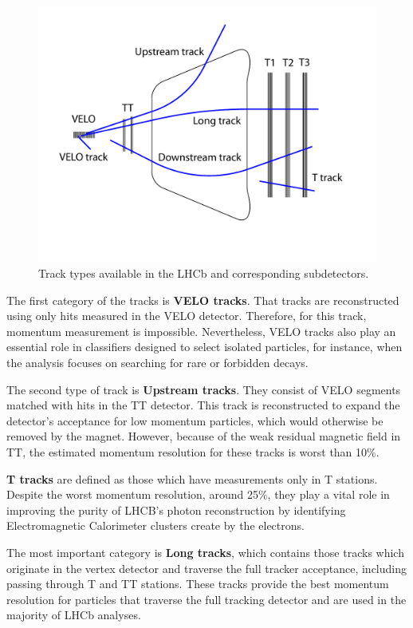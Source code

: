 \begin{figure}
\centering
\includegraphics[scale=0.9]{figures/trackTypes.pdf}
\caption{Track types available in the LHCb and corresponding subdetectors. 
\label{fig:track_types}}
\end{figure}

The first category of the tracks is \textbf{VELO tracks}. That tracks are reconstructed using only hits measured in the VELO detector. Therefore, for this track, momentum measurement is impossible. Nevertheless, VELO tracks also play an essential role in classifiers designed to select isolated particles, for instance, when the analysis focuses on searching for rare or forbidden decays. 

The second type of track is \textbf{Upstream tracks}. They consist of VELO segments matched with hits in the TT detector. This track is reconstructed to expand the detector's acceptance for low momentum particles, which would otherwise be removed by the magnet. However, because of the weak residual magnetic field in TT, the estimated momentum resolution for these tracks is worst than 10\%.

\textbf{T tracks} are defined as those which have measurements only in T stations. Despite the worst momentum resolution, around 25\%, they play a vital role in improving the purity of LHCB's photon reconstruction by identifying Electromagnetic Calorimeter clusters create by the electrons. 

The most important category is \textbf{Long tracks}, which contains those tracks which originate
in the vertex detector and traverse the full tracker acceptance, including passing through T and TT stations. These tracks provide the best momentum resolution for particles that traverse the full tracking detector and are used in the majority of LHCb analyses.

